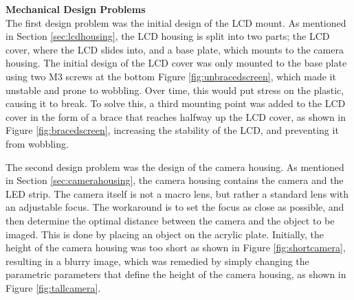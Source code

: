 \noindent
\textbf{Mechanical Design Problems} \\
The first design problem was the initial design of the LCD mount. As mentioned in Section \ref*{sec:lcdhousing},
the LCD housing is split into two parts; the LCD cover, where the LCD slides into, and a base plate, which mounts to the camera housing.
The initial design of the LCD cover was only mounted to the base plate using two M3 screws at the bottom Figure \ref*{fig:unbracedscreen}, which made it unstable and prone to wobbling.
Over time, this would put stress on the plastic, causing it to break. To solve this, a third mounting point was added to the LCD cover in the form of a 
brace that reaches halfway up the LCD cover, as shown in Figure \ref*{fig:bracedscreen}, increasing the stability of the LCD, and preventing it from wobbling.

The second design problem was the design of the camera housing. As mentioned in Section \ref*{sec:camerahousing}, the camera housing contains the camera and the LED strip.
The camera itself is not a macro lens, but rather a standard lens with an adjustable focus. The workaround is to set the focus as close as possible, and then determine the optimal
distance between the camera and the object to be imaged. This is done by placing an object on the acrylic plate. Initially, the height of the camera housing was too short as shown in Figure \ref*{fig:shortcamera}, resulting in a 
blurry image, which was remedied by simply changing the parametric parameters that define the height of the camera housing, as shown in Figure \ref*{fig:tallcamera}. 

